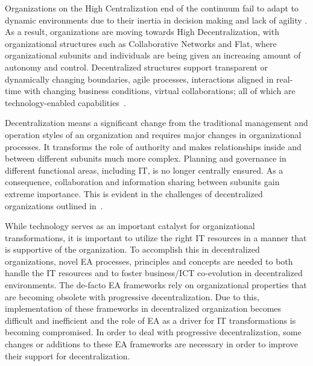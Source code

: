 Organizations on the High Centralization end of the continuum fail to adapt to dynamic environments due to their inertia in decision making and lack of agility \cite{fulk1995,pearlson2009}. As a result, organizations are moving towards High Decentralization, with organizational structures such as Collaborative Networks \cite{Camarinha-Matos2005} and Flat, where organizational subunits and individuals are being given an increasing amount of autonomy and control. Decentralized structures support transparent or dynamically changing boundaries, agile processes, interactions aligned in real-time with changing business conditions, virtual collaborations; all of which are technology-enabled capabilities~\cite{applegate1988,fulk1995}.


Decentralization means a significant change from the traditional management and operation styles of an organization and requires major changes in organizational processes. It transforms the role of authority and makes relationships inside and between different subunits much more complex. Planning and governance in different functional areas, including IT, is no longer centrally ensured. As a consequence, collaboration and information sharing between subunits gain extreme importance. This is evident in the challenges of decentralized organizations outlined in~\cite{caruso2008boundaries}.  


While technology serves as an important catalyst for organizational transformations, it is important to utilize the right IT resources in a manner that is supportive of the organization. To accomplish this in decentralized organizations, novel EA processes, principles and concepts are needed to both handle the IT resources and to foster business/ICT co-evolution in decentralized environments. The de-facto EA frameworks rely on organizational properties that are becoming obsolete with progressive decentralization.  Due to this, implementation of these frameworks in decentralized organization becomes difficult and inefficient and the role of EA as a driver for IT transformations is becoming compromised. In order to deal with progressive decentralization, some changes or additions to these EA frameworks are necessary in order to improve their support for decentralization.




